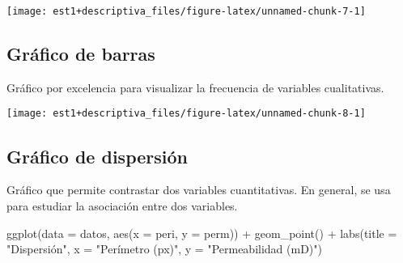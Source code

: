 \documentclass[
]{book}
\newenvironment{Shaded}{\begin{snugshade}}{\end{snugshade}}
\newcommand{\AttributeTok}[1]{\textcolor[rgb]{0.77,0.63,0.00}{#1}}
\newcommand{\DecValTok}[1]{\textcolor[rgb]{0.00,0.00,0.81}{#1}}
\newcommand{\FunctionTok}[1]{\textcolor[rgb]{0.00,0.00,0.00}{#1}}
\newcommand{\NormalTok}[1]{#1}
\newcommand{\OtherTok}[1]{\textcolor[rgb]{0.56,0.35,0.01}{#1}}
\newcommand{\SpecialCharTok}[1]{\textcolor[rgb]{0.00,0.00,0.00}{#1}}
\newcommand{\StringTok}[1]{\textcolor[rgb]{0.31,0.60,0.02}{#1}}
\theoremstyle{definition}
\theoremstyle{definition}
\theoremstyle{definition}
\theoremstyle{definition}
\theoremstyle{remark}
\begin{document}
\begin{center}\texttt{[image: est1+descriptiva\_files/figure-latex/unnamed-chunk-7-1]} \end{center}

\hypertarget{gruxe1fico-de-barras}{%
\subsection*{Gráfico de barras}\label{gruxe1fico-de-barras}}

Gráfico por excelencia para visualizar la frecuencia de variables cualitativas.

\begin{Shaded}
\end{Shaded}

\begin{center}\texttt{[image: est1+descriptiva\_files/figure-latex/unnamed-chunk-8-1]} \end{center}

\hypertarget{gruxe1fico-de-dispersiuxf3n}{%
\subsection*{Gráfico de dispersión}\label{gruxe1fico-de-dispersiuxf3n}}

Gráfico que permite contrastar dos variables cuantitativas. En general, se usa para estudiar la asociación entre dos variables.

\begin{Shaded}
\begin{Highlighting}[]
\FunctionTok{ggplot}\NormalTok{(}\AttributeTok{data =}\NormalTok{ datos, }\FunctionTok{aes}\NormalTok{(}\AttributeTok{x =}\NormalTok{ peri, }\AttributeTok{y =}\NormalTok{ perm)) }\SpecialCharTok{+}
  \FunctionTok{geom\_point}\NormalTok{() }\SpecialCharTok{+}
  \FunctionTok{labs}\NormalTok{(}\AttributeTok{title =} \StringTok{"Dispersión"}\NormalTok{, }\AttributeTok{x =} \StringTok{"Perímetro (px)"}\NormalTok{, }\AttributeTok{y =} \StringTok{"Permeabilidad (mD)"}\NormalTok{)}
\end{Highlighting}
\end{Shaded}
\end{document}
